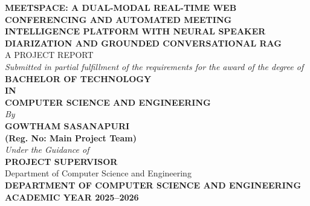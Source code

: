 \documentclass[12pt,oneside,letterpaper]{report}
\numberwithin{equation}{chapter} %
\begin{document}
\begin{titlepage}
\begin{center}
\vspace*{0.5cm}

{\fontsize{18pt}{22pt}\selectfont \textbf{MEETSPACE: A DUAL-MODAL REAL-TIME WEB CONFERENCING AND AUTOMATED MEETING INTELLIGENCE PLATFORM WITH NEURAL SPEAKER DIARIZATION AND GROUNDED CONVERSATIONAL RAG}}\\[1.5cm]

{\fontsize{13pt}{16pt}\selectfont A PROJECT REPORT}\\[0.4cm]
{\fontsize{11pt}{14pt}\selectfont \textit{Submitted in partial fulfillment of the requirements for the award of the degree of}}\\[0.6cm]

{\fontsize{14pt}{18pt}\selectfont \textbf{BACHELOR OF TECHNOLOGY}}\\[0.3cm]
{\fontsize{12pt}{15pt}\selectfont \textbf{IN}}\\[0.3cm]
{\fontsize{14pt}{18pt}\selectfont \textbf{COMPUTER SCIENCE AND ENGINEERING}}\\[1.8cm]

{\fontsize{12pt}{15pt}\selectfont \textit{By}}\\[0.4cm]
{\fontsize{13pt}{16pt}\selectfont \textbf{GOWTHAM SASANAPURI}}\\[0.2cm]
{\fontsize{11pt}{14pt}\selectfont \textbf{(Reg. No: Main Project Team)}}\\[2.0cm]

{\fontsize{12pt}{15pt}\selectfont \textit{Under the Guidance of}}\\[0.4cm]
{\fontsize{13pt}{16pt}\selectfont \textbf{PROJECT SUPERVISOR}}\\[0.2cm]
{\fontsize{11pt}{14pt}\selectfont Department of Computer Science and Engineering}\\[2.0cm]

{\fontsize{13pt}{16pt}\selectfont \textbf{DEPARTMENT OF COMPUTER SCIENCE AND ENGINEERING}}\\[0.3cm]
{\fontsize{11pt}{14pt}\selectfont \textbf{ACADEMIC YEAR 2025--2026}}\\[0.5cm]

\end{center}
\end{titlepage}

\setcounter{page}{2}
\end{document}
